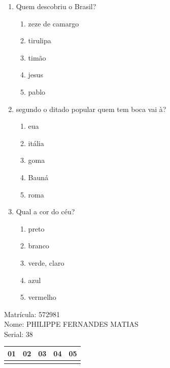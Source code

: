 \documentclass[10pt,a4paper,twocolumn]{report}
\begin{document}
 \begin{enumerate} 
    \item  Quem descobriu o Brasil?





    \begin{enumerate}
    \item  zeze de camargo

\item  tirulipa

\item  timão

\item  jesus

\item  pablo


    \end{enumerate} 
    \item  segundo o ditado popular quem tem boca vai à?





    \begin{enumerate}
    \item  eua

\item  itália

\item  goma

\item  Bauná

\item  roma


    \end{enumerate} 
    \item  Qual a cor do céu?





    \begin{enumerate}
    \item  preto

\item  branco

\item  verde, claro

\item  azul

\item  vermelho


    \end{enumerate}\end{enumerate} 
Matrícula: 572981\\ Nome: PHILIPPE FERNANDES MATIAS \\ Serial: 38\\
\begin{tabular}{|l|l|l|l|l|}\hline
01  &02  &03  &04  &05 \\ \hline 
 & & & & \\ \hline 
\end{tabular}
 \cleardoublepage 
\end{document}
